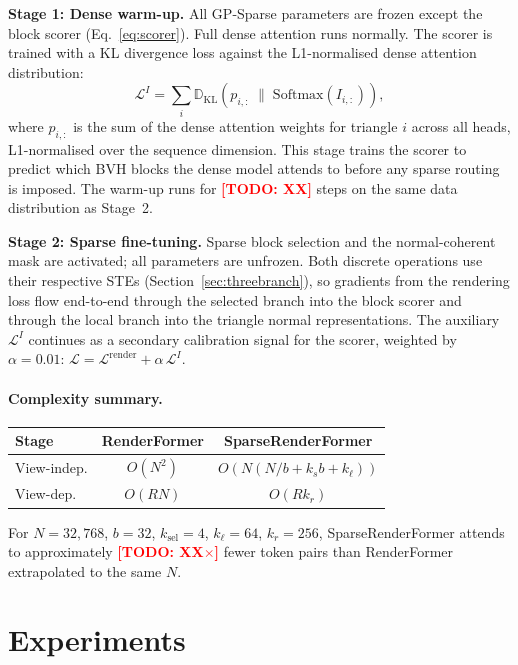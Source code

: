 \documentclass{egpubl}
\newcommand{\ours}{SparseRenderFormer\xspace}
\newcommand{\RF}{RenderFormer\xspace}
\newcommand{\todo}[1]{\textcolor{red}{\textbf{[TODO: #1]}}}
\begin{document}
\textbf{Stage 1: Dense warm-up.}
All GP-Sparse parameters are frozen except the block scorer
(Eq.~\ref{eq:scorer}).
Full dense attention runs normally.
The scorer is trained with a KL divergence loss against the L1-normalised
dense attention distribution:
\begin{equation}
  \mathcal{L}^I = \sum_i
    \mathbb{D}_{\mathrm{KL}}\!\left(
      p_{i,:} \;\Big\|\; \mathrm{Softmax}(I_{i,:})
    \right),
  \label{eq:scorer_kl}
\end{equation}
where $p_{i,:}$ is the sum of the dense attention weights for triangle $i$
across all heads, L1-normalised over the sequence dimension.
This stage trains the scorer to predict which BVH blocks the dense model
attends to before any sparse routing is imposed.
The warm-up runs for \todo{XX} steps on the same data distribution as Stage~2.

\textbf{Stage 2: Sparse fine-tuning.}
Sparse block selection and the normal-coherent mask are activated; all
parameters are unfrozen.
Both discrete operations use their respective STEs
(Section~\ref{sec:threebranch}), so gradients from the rendering loss flow
end-to-end through the selected branch into the block scorer and through
the local branch into the triangle normal representations.
The auxiliary $\mathcal{L}^I$ continues as a secondary calibration signal
for the scorer, weighted by $\alpha = 0.01$:
$\mathcal{L} = \mathcal{L}^{\text{render}} + \alpha\,\mathcal{L}^I$.

\paragraph{Complexity summary.}
\begin{center}\small
\begin{tabular}{lcc}
\toprule
Stage & \RF & \ours \\
\midrule
View-indep. & $O(N^2)$ & $O(N(N/b + k_s b + k_\ell))$ \\
View-dep. & $O(RN)$ & $O(Rk_r)$ \\
\bottomrule
\end{tabular}
\end{center}
For $N = 32{,}768$, $b = 32$, $k_\text{sel} = 4$, $k_\ell = 64$,
$k_r = 256$, \ours attends to approximately \todo{XX$\times$} fewer token
pairs than \RF extrapolated to the same $N$.

\section{Experiments}
\label{sec:experiments}
\end{document}
